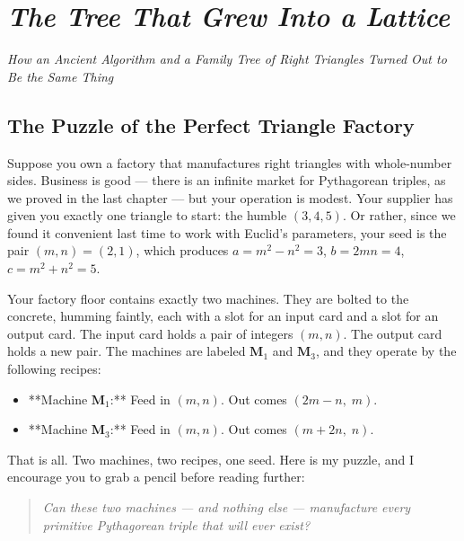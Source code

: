\chapter{\textit{The Tree That Grew Into a Lattice}}
\begin{center}\large\itshape \textit{How an Ancient Algorithm and a Family Tree of Right Triangles Turned Out to Be the Same Thing}\end{center}
\medskip
\label{ch02}




\bigskip


\section{The Puzzle of the Perfect Triangle Factory}

Suppose you own a factory that manufactures right triangles with whole-number sides. Business is good --- there is an infinite market for Pythagorean triples, as we proved in the last chapter --- but your operation is modest. Your supplier has given you exactly one triangle to start: the humble $(3, 4, 5)$. Or rather, since we found it convenient last time to work with Euclid's parameters, your seed is the pair $(m, n) = (2, 1)$, which produces $a = m^2 - n^2 = 3$, $b = 2mn = 4$, $c = m^2 + n^2 = 5$.

Your factory floor contains exactly two machines. They are bolted to the concrete, humming faintly, each with a slot for an input card and a slot for an output card. The input card holds a pair of integers $(m, n)$. The output card holds a new pair. The machines are labeled $\mathbf{M}_1$ and $\mathbf{M}_3$, and they operate by the following recipes:

\begin{itemize}
\item **Machine $\mathbf{M}_1$:** Feed in $(m, n)$. Out comes $(2m - n,\; m)$.
\item **Machine $\mathbf{M}_3$:** Feed in $(m, n)$. Out comes $(m + 2n,\; n)$.
\end{itemize}
That is all. Two machines, two recipes, one seed. Here is my puzzle, and I encourage you to grab a pencil before reading further:

\begin{quote}
\itshape \textit{Can these two machines --- and nothing else --- manufacture every primitive Pythagorean triple that will ever exist?}
\end{quote}

